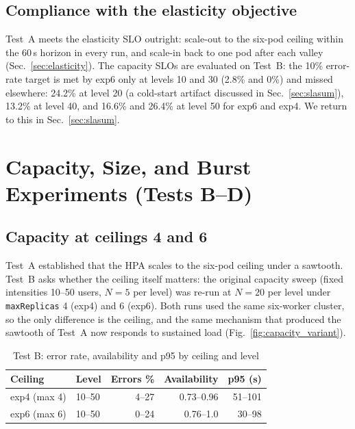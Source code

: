 \documentclass[conference]{IEEEtran}
\newcommand{\code}[1]{\texttt{#1}}
\begin{document}
\subsection{Compliance with the elasticity objective}

Test~A meets the elasticity SLO outright: scale-out to the six-pod ceiling
within the 60\,s horizon in every run, and scale-in back to one pod after
each valley (Sec.~\ref{sec:elasticity}). The capacity SLOs are evaluated on
Test~B: the 10\% error-rate target is met by exp6 only at
levels 10 and 30 (2.8\% and 0\%) and missed elsewhere: 24.2\% at level 20
(a cold-start artifact discussed in Sec.~\ref{sec:slasum}), 13.2\% at level
40, and 16.6\% and 26.4\% at level 50 for exp6 and exp4. We return to this in
Sec.~\ref{sec:slasum}.

\section{Capacity, Size, and Burst Experiments (Tests B--D)}
\label{sec:campaignB}

\subsection{Capacity at ceilings 4 and 6}
\label{sec:variants}

Test~A established that the HPA scales to the six-pod ceiling under a
sawtooth. Test~B asks whether the ceiling itself matters: the original
capacity sweep (fixed intensities 10--50 users, $N{=}5$ per level) was
re-run at $N{=}20$ per level under \code{maxReplicas} 4 (exp4) and 6 (exp6).
Both runs used the same six-worker cluster, so the only difference is the
ceiling, and the same mechanism that produced the sawtooth of Test~A now
responds to sustained load (Fig.~\ref{fig:capacity_variant}).

\begin{table}[t]
\caption{Test B: error rate, availability and p95 by ceiling and level}
\label{tab:variants}
\centering\small
\begin{tabular}{@{}llrrr@{}}
\toprule
Ceiling & Level & Errors \% & Availability & p95 (s) \\
\midrule
exp4 (max 4) & 10--50 & 4--27  & 0.73--0.96 & 51--101 \\
exp6 (max 6) & 10--50 & 0--24  & 0.76--1.0  & 30--98 \\
\bottomrule
\end{tabular}
\end{table}
\end{document}
